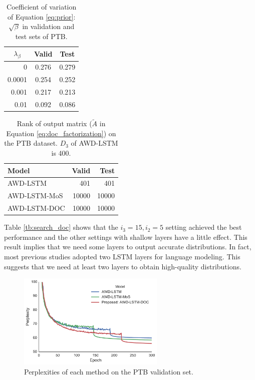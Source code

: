 \documentclass[11pt,a4paper]{article}
\begin{document}
\begin{table}[!t]
  \centering
  \small
  \begin{tabular}{| r | c c |} \hline
  \multicolumn{1}{|c|}{ $\lambda_{\beta}$ } & Valid & Test \\ \hline
  0 & 0.276 & 0.279 \\
  0.0001 & 0.254 & 0.252 \\
  0.001 & 0.217 & 0.213 \\
  0.01 & 0.092 & 0.086 \\ \hline
  \end{tabular}
  \caption{Coefficient of variation of Equation \ref{eq:prior}: $\sqrt{\beta}$ in validation and test sets of PTB.\label{tb:cv}}
\end{table}

\begin{table}[!t]
  \centering
  \small
  \begin{tabular}{| l | r r |} \hline
  Model & Valid & Test \\ \hline
  AWD-LSTM & 401 & 401 \\
  AWD-LSTM-MoS & 10000 & 10000 \\
  AWD-LSTM-DOC & 10000 & 10000 \\ \hline
  \end{tabular}
  \caption{Rank of output matrix ($\tilde{A}$ in Equation \ref{eq:doc_factorization}) on the PTB dataset. $D_{3}$ of AWD-LSTM is 400.\label{tb:output_rank}}
\end{table}

Table \ref{tb:search_doc} shows that the $i_{3}=15, i_{2}=5$ setting achieved the best performance and the other settings with shallow layers have a little effect.
This result implies that we need some layers to output accurate distributions.
In fact, most previous studies adopted two LSTM layers for language modeling.
This suggests that we need at least two layers to obtain high-quality distributions.



\begin{figure}[!t]
  \centering
  \includegraphics[width=7cm]{./learning_curve.pdf}
   \caption{Perplexities of each method on the PTB validation set.\label{fig:learning_curve}}
\end{figure}
\end{document}
